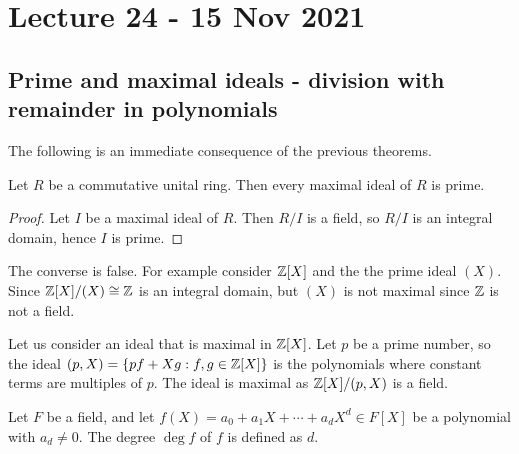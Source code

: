 \section{Lecture 24 - 15 Nov 2021}
\subsection{Prime and maximal ideals - division with remainder in polynomials}
The following is an immediate consequence of the previous theorems.
\begin{corollary}
  Let $R$ be a commutative unital ring. Then every maximal ideal of $R$ is prime.
  \label{cor:maximalPrime}
\end{corollary}
\begin{proof}
  Let $I$ be a maximal ideal of $R$. Then $R/I$ is a field, so $R/I$ is an integral
  domain, hence $I$ is prime.
\end{proof}

\begin{remark}
  The converse is false. For example consider $\mathbb Z[X]$ and the the prime ideal $(X)$. Since $\mathbb Z[X]/(X)\cong
  \mathbb Z$ is an integral domain, but $(X)$ is not maximal since $\mathbb Z$ is not a field. 
\end{remark}
\begin{example}
    Let us consider an ideal that is maximal in $\mathbb Z[X]$. Let
  $p$ be a prime number, so the ideal $(p,X)=\{pf+Xg: f,g\in\mathbb Z[X]\}$ is the polynomials
  where constant terms are multiples of $p$. The ideal is maximal as $\mathbb Z[X]/(p,X)$ is a field.
\end{example}
\begin{definition}
  Let $F$ be a field, and let $f(X)=a_0+a_1X+\cdots + a_d X^d\in F[X]$ be a polynomial
  with $a_d\neq 0$. The degree $\deg f$ of $f$ is defined as $d$.
  \label{<+label+>}
\end{definition}

